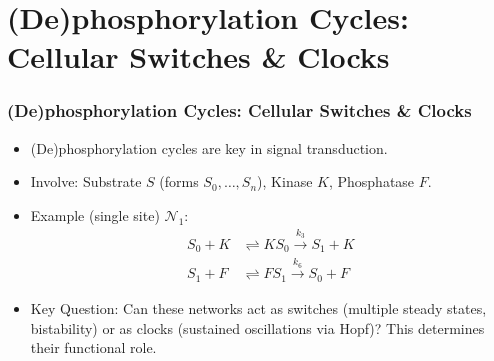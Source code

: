 \documentclass[aspectratio=169]{beamer}
\begin{document}
\section{(De)phosphorylation Cycles: Cellular Switches \& Clocks}

\begin{frame}{\insertsectionhead}
\frametitle{(De)phosphorylation Cycles: Cellular Switches \& Clocks}
\begin{itemize}
	\item (De)phosphorylation cycles are key in \alert{signal transduction}.
	\item Involve: Substrate $S$ (forms $S_0, \dots, S_n$), Kinase $K$, Phosphatase $F$.
	\item Example (single site) $\mathcal{N}_1$:
		\begin{align*}
			S_0 + K &\rightleftharpoons KS_0 \xrightarrow{k_3} S_1 + K \\
			S_1 + F &\rightleftharpoons FS_1 \xrightarrow{k_6} S_0 + F
		\end{align*}
	\item \alert{Key Question}: Can these networks act as \alert{switches} (multiple steady states, bistability) or as \alert{clocks} (sustained oscillations via Hopf)? This determines their functional role.
\end{itemize}
\end{frame}
\end{document}
